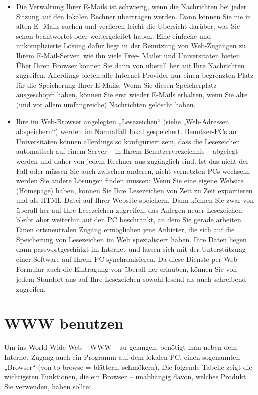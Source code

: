 \documentclass[]{book}
\providecommand{\tightlist}{%
  \setlength{\itemsep}{0pt}\setlength{\parskip}{0pt}}
\theoremstyle{definition}
\theoremstyle{definition}
\theoremstyle{definition}
\theoremstyle{remark}
\begin{document}
\begin{itemize}
\tightlist
\item
  Die Verwaltung Ihrer E-Mails ist schwierig, wenn die Nachrichten bei
  jeder Sitzung auf den lokalen Rechner übertragen werden. Dann können
  Sie nie in alten E- Mails suchen und verlieren leicht die Übersicht
  darüber, was Sie schon beantwortet oder weitergeleitet haben. Eine
  einfache und unkomplizierte Lösung dafür liegt in der Benutzung von
  Web-Zugängen zu Ihrem E-Mail-Server, wie ihn viele Free- Mailer und
  Universitäten bieten. Über Ihren Browser können Sie dann von überall
  her auf Ihre Nachrichten zugreifen. Allerdings bieten alle
  Internet-Provider nur einen begrenzten Platz für die Speicherung Ihrer
  E-Mails. Wenn Sie diesen Speicherplatz ausgeschöpft haben, können Sie
  erst wieder E-Mails erhalten, wenn Sie alte (und vor allem
  umfangreiche) Nachrichten gelöscht haben.
\item
  Ihre im Web-Browser angelegten „Lesezeichen`` (siehe „Web-Adressen
  abspeichern``) werden im Normalfall lokal gespeichert. Benutzer-PCs an
  Universitäten können allerdings so konfiguriert sein, dass die
  Lesezeichen automatisch auf einem Server -- in Ihrem
  Benutzervrezeichnis -- abgelegt werden und daher von jedem Rechner aus
  zugänglich sind. Ist das nicht der Fall oder müssen Sie auch zwischen
  anderen, nicht vernetzten PCs wechseln, werden Sie andere Lösungen
  finden müssen: Wenn Sie eine eigene Website (Homepage) haben, können
  Sie Ihre Lesezeichen von Zeit zu Zeit exportieren und als HTML-Datei
  auf Ihrer Website speichern. Dann können Sie zwar von überall her auf
  Ihre Lesezeichen zugreifen, das Anlegen neuer Lesezeichen bleibt aber
  weiterhin auf den PC beschränkt, an dem Sie gerade arbeiten. Einen
  ortsneutralen Zugang ermöglichen jene Anbieter, die sich auf die
  Speicherung von Lesezeichen im Web spezialisiert haben. Ihre Daten
  liegen dann passwortgeschützt im Internet und lassen sich mit der
  Unterstützung einer Software auf Ihrem PC synchronisieren. Da diese
  Dienste per Web- Formular auch die Eintragung von überall her
  erlauben, können Sie von jedem Standort aus auf Ihre Lesezeichen
  sowohl lesend als auch schreibend zugreifen.
\end{itemize}

\section{WWW benutzen}\label{www-benutzen}

Um ins World Wide Web -- WWW -- zu gelangen, benötigt man neben dem
Internet-Zugang auch ein Programm auf dem lokalen PC, einen sogenannten
„Browser`` (von to browse = blättern, schmökern). Die folgende Tabelle
zeigt die wichtigsten Funktionen, die ein Browser -- unabhängig davon,
welches Produkt Sie verwenden, haben sollte:
\end{document}
